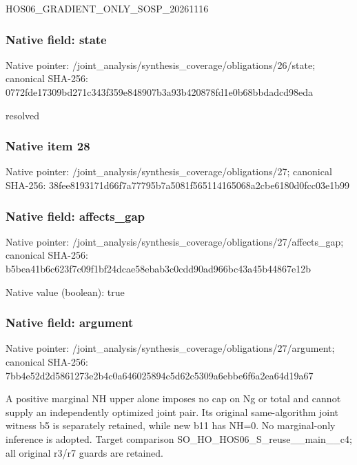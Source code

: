 \documentclass[10pt,a4paper]{article}
\begin{document}
\begingroup\raggedright\sloppy HOS06\_\allowbreak{}GRADIENT\_\allowbreak{}ONLY\_\allowbreak{}SOSP\_\allowbreak{}20261116\par\endgroup

\subsubsection{Native field: state}
Native pointer: /joint\_\allowbreak{}analysis/synthesis\_\allowbreak{}coverage/obligations/26/state; canonical SHA-256: 0772fde17309bd271c343f359e848907b3a93b420878fd1e0b68bbdadcd98eda

\begingroup\raggedright\sloppy resolved\par\endgroup

\subsubsection{Native item 28}
Native pointer: /joint\_\allowbreak{}analysis/synthesis\_\allowbreak{}coverage/obligations/27; canonical SHA-256: 38fee8193171d66f7a77795b7a5081f565114165068a2cbe6180d0fcc03e1b99

\subsubsection{Native field: affects\_\allowbreak{}gap}
Native pointer: /joint\_\allowbreak{}analysis/synthesis\_\allowbreak{}coverage/obligations/27/affects\_\allowbreak{}gap; canonical SHA-256: b5bea41b6c623f7c09f1bf24dcae58ebab3c0cdd90ad966bc43a45b44867e12b

Native value (boolean): true

\subsubsection{Native field: argument}
Native pointer: /joint\_\allowbreak{}analysis/synthesis\_\allowbreak{}coverage/obligations/27/argument; canonical SHA-256: 7bb4e52d2d5861273e2b4c0a646025894c5d62c5309a6ebbe6f6a2ea64d19a67

\begingroup\raggedright\sloppy A positive marginal NH upper alone imposes no cap on Ng or total and cannot supply an independently optimized joint pair. Its original same-algorithm joint witness b5 is separately retained,\allowbreak{} while new b11 has NH=\allowbreak{}0. No marginal-only inference is adopted. Target comparison SO\_\allowbreak{}HO\_\allowbreak{}HOS06\_\allowbreak{}S\_\allowbreak{}reuse\_\allowbreak{}\_\allowbreak{}main\_\allowbreak{}\_\allowbreak{}c4;\allowbreak{} all original r3/\allowbreak{}r7 guards are retained.\par\endgroup
\end{document}

